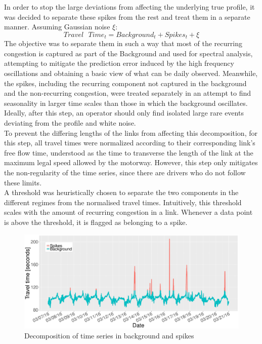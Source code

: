 \documentclass[conference, letterpaper]{IEEEtran}
\begin{document}
In order to stop the large deviations from affecting the underlying true profile, it was decided to separate these spikes from the rest and treat them in a separate manner. 
Assuming Gaussian noise $\xi$:
\begin{equation}
Travel \textrm{ } Time_t = Background_t + Spikes_t + \xi
\end{equation}
The objective was to separate them in such a way that most of the recurring congestion is captured as part of the Background and used for spectral analysis, attempting to mitigate the prediction error induced by the high frequency oscillations and obtaining a basic view of what can be daily observed.
Meanwhile, the spikes, including the recurring component not captured in the background and the non-recurring congestion, were treated separately in an attempt to find seasonality in larger time scales than those in which the background oscillates. 
Ideally, after this step, an operator should only find isolated large rare events deviating from the profile and white noise.\\

To prevent the differing lengths of the links from affecting this decomposition, for this step, all travel times were normalized according to their corresponding link's free flow time, understood as the time to transverse the length of the link at the maximum legal speed allowed by the motorway. 
However, this step only mitigates the non-regularity of the time series, since there are drivers who do not follow these limits.\\

A threshold was heuristically chosen to separate the two components in the different regimes from the normalised travel times. 
Intuitively, this threshold scales with the amount of recurring congestion in a link. 
Whenever a data point is above the threshold, it is flagged as belonging to a spike.

\begin{figure}[htbp]
	\centering
	\includegraphics[width=\linewidth]{BS.pdf}
	\caption{ Decomposition of time series in background and spikes }
	\label{fig:Background}
\end{figure}
\end{document}
